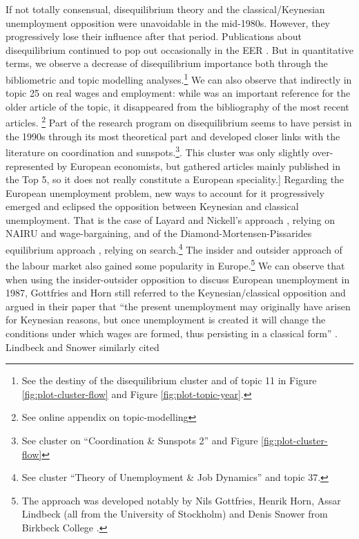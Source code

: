 \documentclass[]{elsarticle} %
\begin{document}
If not totally consensual, disequilibrium theory and the
classical/Keynesian unemployment opposition were unavoidable in the
mid-1980s. However, they progressively lose their influence after that
period. Publications about disequilibrium continued to pop out
occasionally in the EER . But in quantitative terms, we observe a
decrease of disequilibrium importance both through the bibliometric and
topic modelling analyses.\footnote{See the destiny of the disequilibrium
  cluster and of topic 11 in Figure \ref{fig:plot-cluster-flow} and
  Figure \ref{fig:plot-topic-year}.} We can also observe that indirectly
in topic 25 on real wages and employment: while \citet{malinvaud1977}
was an important reference for the older article of the topic, it
disappeared from the bibliography of the most recent articles.
\footnote{See online appendix on topic-modelling} Part of the research
program on disequilibrium seems to have persist in the 1990s through its
most theoretical part and developed closer links with the literature on
coordination and sunspots.\footnote{See cluster on ``Coordination \&
  Sunspots 2'' and Figure \ref{fig:plot-cluster-flow}}. This cluster was
only slightly over-represented by European economists, but gathered
articles mainly published in the Top 5, so it does not really constitute
a European speciality.{]} Regarding the European unemployment problem,
new ways to account for it progressively emerged and eclipsed the
opposition between Keynesian and classical unemployment. That is the
case of Layard and Nickell's approach
\citep{grubb1982, layard1986, layard1991a}, relying on NAIRU and
wage-bargaining, and of the Diamond-Mortensen-Pissarides equilibrium
approach \citep{pissarides1990, mortensen1994}, relying on
search.\footnote{See cluster ``Theory of Unemployment \& Job Dynamics''
  and topic 37.} The insider and outsider approach of the labour market
also gained some popularity in Europe.\footnote{The approach was
  developed notably by Nils Gottfries, Henrik Horn, Assar Lindbeck (all
  from the University of Stockholm) and Denis Snower from Birkbeck
  College
  \citep{gottfries1987, gottfries1992, lindbeck1986, lindbeck1987a}.} We
can observe that when using the insider-outsider opposition to discuss
European unemployment in 1987, Gottfries and Horn still referred to the
Keynesian/classical opposition and argued in their paper that ``the
present unemployment may originally have arisen for Keynesian reasons,
but once unemployment is created it will change the conditions under
which wages are formed, thus persisting in a classical form''
\citep[2]{gottfries1987}. Lindbeck and Snower similarly cited
\end{document}
